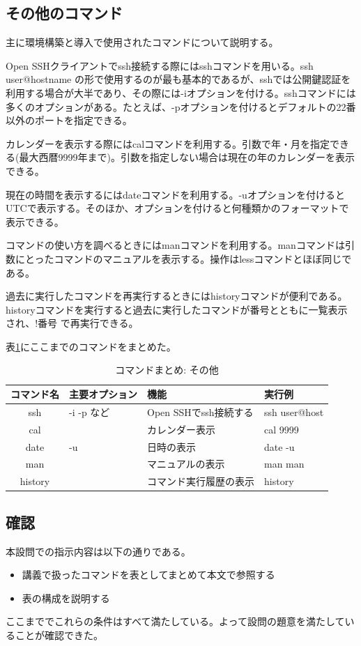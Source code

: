 \documentclass[dvipdfmx,12pt,a4j]{jarticle}
\begin{document}
\subsection{その他のコマンド}
主に環境構築と導入で使用されたコマンドについて説明する。

Open SSHクライアントでssh接続する際にはsshコマンドを用いる。ssh  user@hostname の形で使用するのが最も基本的であるが、sshでは公開鍵認証を利用する場合が大半であり、その際には-iオプションを付ける。sshコマンドには多くのオプションがある。たとえば、-pオプションを付けるとデフォルトの22番以外のポートを指定できる。

カレンダーを表示する際にはcalコマンドを利用する。引数で年・月を指定できる(最大西暦9999年まで)。引数を指定しない場合は現在の年のカレンダーを表示できる。

現在の時間を表示するにはdateコマンドを利用する。-uオプションを付けるとUTCで表示する。そのほか、オプションを付けると何種類かのフォーマットで表示できる。

コマンドの使い方を調べるときにはmanコマンドを利用する。manコマンドは引数にとったコマンドのマニュアルを表示する。操作はlessコマンドとほぼ同じである。

過去に実行したコマンドを再実行するときにはhistoryコマンドが便利である。historyコマンドを実行すると過去に実行したコマンドが番号とともに一覧表示され、!番号 で再実行できる。

表\ref{table:command:other}にここまでのコマンドをまとめた。

\begin{table}[H]
  \caption{コマンドまとめ: その他}
  \label{table:command:other}
  \begin{tabular}{|c|l|l|l|}
    \hline
    コマンド名 & 主要オプション & 機能 & 実行例\\
    \hline \hline
    ssh & -i -p など & Open SSHでssh接続する & ssh user@host \\ 
    cal & & カレンダー表示 & cal 9999\\
    date & -u & 日時の表示 & date -u \\
    man & & マニュアルの表示 & man man \\
    history & & コマンド実行履歴の表示 & history\\
    \hline
  \end{tabular}
\end{table}

\subsection{確認}
本設問での指示内容は以下の通りである。
\begin{itemize}
  \item 講義で扱ったコマンドを表としてまとめて本文で参照する
  \item 表の構成を説明する
\end{itemize}
ここまででこれらの条件はすべて満たしている。よって設問の題意を満たしていることが確認できた。
\end{document}
